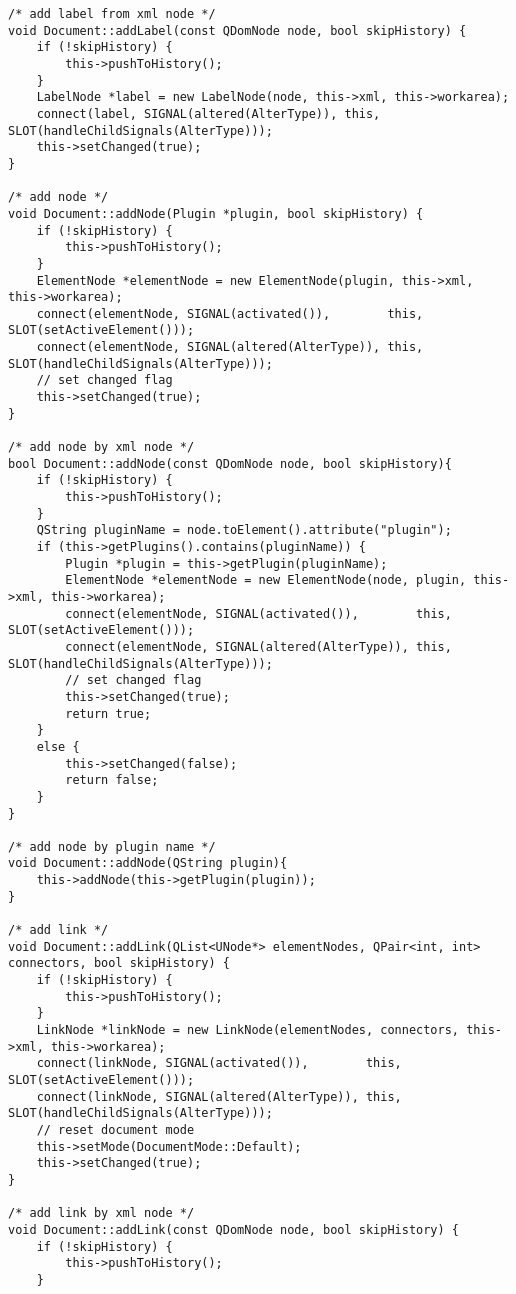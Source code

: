 \begin{lstlisting}
/* add label from xml node */
void Document::addLabel(const QDomNode node, bool skipHistory) {
    if (!skipHistory) {
        this->pushToHistory();
    }
    LabelNode *label = new LabelNode(node, this->xml, this->workarea);
    connect(label, SIGNAL(altered(AlterType)), this, SLOT(handleChildSignals(AlterType)));
    this->setChanged(true);
}

/* add node */
void Document::addNode(Plugin *plugin, bool skipHistory) {
    if (!skipHistory) {
        this->pushToHistory();
    }
    ElementNode *elementNode = new ElementNode(plugin, this->xml, this->workarea);
    connect(elementNode, SIGNAL(activated()),        this, SLOT(setActiveElement()));
    connect(elementNode, SIGNAL(altered(AlterType)), this, SLOT(handleChildSignals(AlterType)));
    // set changed flag
    this->setChanged(true);
}

/* add node by xml node */
bool Document::addNode(const QDomNode node, bool skipHistory){
    if (!skipHistory) {
        this->pushToHistory();
    }
    QString pluginName = node.toElement().attribute("plugin");
    if (this->getPlugins().contains(pluginName)) {
        Plugin *plugin = this->getPlugin(pluginName);
        ElementNode *elementNode = new ElementNode(node, plugin, this->xml, this->workarea);
        connect(elementNode, SIGNAL(activated()),        this, SLOT(setActiveElement()));
        connect(elementNode, SIGNAL(altered(AlterType)), this, SLOT(handleChildSignals(AlterType)));
        // set changed flag
        this->setChanged(true);
        return true;
    }
    else {
        this->setChanged(false);
        return false;
    }
}

/* add node by plugin name */
void Document::addNode(QString plugin){
    this->addNode(this->getPlugin(plugin));
}

/* add link */
void Document::addLink(QList<UNode*> elementNodes, QPair<int, int> connectors, bool skipHistory) {
    if (!skipHistory) {
        this->pushToHistory();
    }
    LinkNode *linkNode = new LinkNode(elementNodes, connectors, this->xml, this->workarea);
    connect(linkNode, SIGNAL(activated()),        this, SLOT(setActiveElement()));
    connect(linkNode, SIGNAL(altered(AlterType)), this, SLOT(handleChildSignals(AlterType)));
    // reset document mode
    this->setMode(DocumentMode::Default);
    this->setChanged(true);
}

/* add link by xml node */
void Document::addLink(const QDomNode node, bool skipHistory) {
    if (!skipHistory) {
        this->pushToHistory();
    }


\end{lstlisting}
